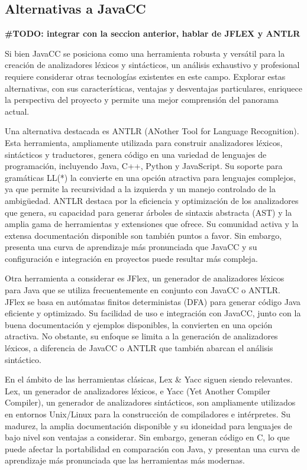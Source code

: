 \subsection{Alternativas a JavaCC}

\textbf{\#TODO: integrar con la seccion anterior, hablar de JFLEX y ANTLR}

\noindent Si bien JavaCC se posiciona como una herramienta robusta y versátil para la creación de analizadores léxicos y sintácticos, un análisis exhaustivo y profesional requiere considerar otras tecnologías existentes en este campo. Explorar estas alternativas, con sus características, ventajas y desventajas particulares, enriquece la perspectiva del proyecto y permite una mejor comprensión del panorama actual.

Una alternativa destacada es ANTLR (ANother Tool for Language Recognition). Esta herramienta, ampliamente utilizada para construir analizadores léxicos, sintácticos y traductores, genera código en una variedad de lenguajes de programación, incluyendo Java, C++, Python y JavaScript. Su soporte para gramáticas LL(*) la convierte en una opción atractiva para lenguajes complejos, ya que permite la recursividad a la izquierda y un manejo controlado de la ambigüedad. ANTLR destaca por la eficiencia y optimización de los analizadores que genera, su capacidad para generar árboles de sintaxis abstracta (AST) y la amplia gama de herramientas y extensiones que ofrece. Su comunidad activa y la extensa documentación disponible son también puntos a favor. Sin embargo, presenta una curva de aprendizaje más pronunciada que JavaCC y su configuración e integración en proyectos puede resultar más compleja.

Otra herramienta a considerar es JFlex, un generador de analizadores léxicos para Java que se utiliza frecuentemente en conjunto con JavaCC o ANTLR. JFlex se basa en autómatas finitos deterministas (DFA) para generar código Java eficiente y optimizado. Su facilidad de uso e integración con JavaCC, junto con la buena documentación y ejemplos disponibles, la convierten en una opción atractiva. No obstante, su enfoque se limita a la generación de analizadores léxicos, a diferencia de JavaCC o ANTLR que también abarcan el análisis sintáctico.

En el ámbito de las herramientas clásicas, Lex \& Yacc siguen siendo relevantes. Lex, un generador de analizadores léxicos, e Yacc (Yet Another Compiler Compiler), un generador de analizadores sintácticos, son ampliamente utilizados en entornos Unix/Linux para la construcción de compiladores e intérpretes. Su madurez, la amplia documentación disponible y su idoneidad para lenguajes de bajo nivel son ventajas a considerar. Sin embargo, generan código en C, lo que puede afectar la portabilidad en comparación con Java, y presentan una curva de aprendizaje más pronunciada que las herramientas más modernas.

